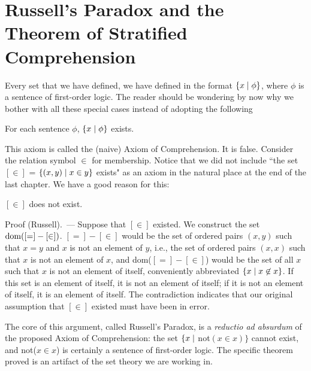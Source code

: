 \chapter[Stratified Comprehension]{Russell's Paradox and the\\ Theorem of
Stratified Comprehension}

Every set that we have defined, we have defined in the format
$\{x \mid \phi\}$, where $\phi$ is a sentence of first-order logic.
The reader should be wondering by now why we bother with all these
special cases instead of adopting the following

\begin{staraxiom}
 For each sentence $\phi$, $\{x \mid \phi\}$ exists.
\end{staraxiom}

This axiom is called the (naive) Axiom of Comprehension.
It is false.
Consider the relation symbol $\in$ for membership.  Notice
that we did not include ``the set $[\in]$ = $\{(x,y) \mid x \in y\}$ exists" as
an axiom in the natural place at the end of the last chapter.  We have a good
reason for this:

\begin{thm}
 $[\in]$ does not exist.
\end{thm}

{\sc Proof} (Russell).~--- Suppose that $[\in]$ existed.  We construct the set 
\linebreak $\mathop{\mathrm{dom}}([=] - [\in])$.  $[=] - [\in]$ would be the set of ordered
pairs $(x,y)$ such 
that $x = y$ and $x$ is not an element of $y$, i.e., the set of ordered
pairs $(x,x)$ such that $x$ is not an element of $x$, and dom($[=] - [\in]$)
would be the set of all $x$ such that $x$ is not an element of itself,
conveniently abbreviated \linebreak $\{x \mid x \not\in x\}$.  If this set is an element
of itself, it is not an element of itself; if it is not an element of
itself, it is an element of itself.  The contradiction indicates that
our original assumption that $[\in]$ existed must have been in error.
\finpreuve

The core of this argument, called Russell's Paradox,
is a {\itshape reductio ad absurdum\/} of the proposed Axiom of
Comprehension: the set
$\{x \mid$ not$(x \in x)\}$ cannot exist, and not($x \in x$) is
certainly a sentence 
of first-order logic.  The specific theorem proved is an artifact of
the set theory we are working in.

